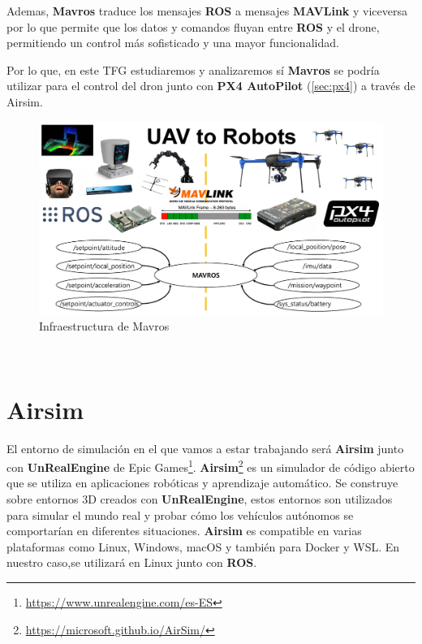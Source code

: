 Ademas, \textbf{Mavros} traduce los mensajes \textbf{ROS} a mensajes \textbf{MAVLink} y viceversa por lo que permite que los datos y comandos fluyan entre \textbf{ROS} y el drone, 
permitiendo un control más sofisticado y una mayor funcionalidad. \newline

Por lo que, en este TFG estudiaremos y analizaremos sí \textbf{Mavros} se podría utilizar para el control del dron junto con \textbf{PX4 AutoPilot} (\ref{sec:px4}) a través
de Airsim. \newline

\begin{figure} [H]
  \begin{center}
    \includegraphics[scale=0.4]{figs/Plataformas_Desarollo/mavros.jpg}
  \end{center}
  \caption{Infraestructura de Mavros}
  \label{fig:InfraROS}
\end{figure}\


\section{Airsim}
\label{sec:Airsim}
El entorno de simulación en el que vamos a estar trabajando será \textbf{Airsim} junto con \textbf{UnRealEngine} de Epic Games\footnote{\url{https://www.unrealengine.com/es-ES}}. \textbf{Airsim}\footnote{\url{https://microsoft.github.io/AirSim/}} es un simulador de código abierto que se utiliza en aplicaciones robóticas 
y aprendizaje automático.
Se construye sobre entornos 3D creados con \textbf{UnRealEngine}, estos entornos son utilizados para simular el mundo real y probar 
cómo los vehículos autónomos se comportarían en diferentes situaciones. \textbf{Airsim} es compatible en varias plataformas como Linux, Windows, macOS y también para Docker y WSL. En nuestro caso,se utilizará en Linux junto
con \textbf{ROS}. \newline

